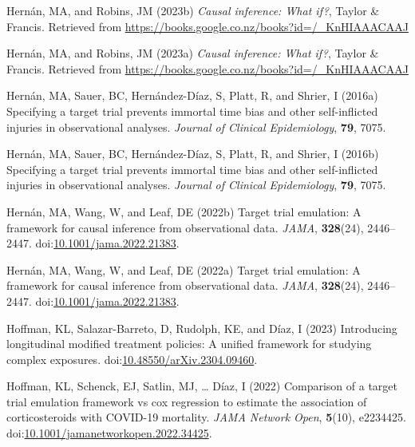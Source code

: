 \documentclass[
  singlecolumn]{article}
\newlength{\cslhangindent}
\newlength{\cslentryspacingunit} %
\newenvironment{CSLReferences}[2] %
 {%
  \setlength{\parindent}{0pt}
  \ifodd #1
  \let\oldpar\par
  \def\par{\hangindent=\cslhangindent\oldpar}
  \fi
  \setlength{\parskip}{#2\cslentryspacingunit}
 }%
 {}
\begin{document}
\begin{CSLReferences}{1}{0}
\leavevmode{}%
Hernán, MA, and Robins, JM (2023b) \emph{Causal inference: What if?},
Taylor \& Francis. Retrieved from
\url{https://books.google.co.nz/books?id=/_KnHIAAACAAJ}

\leavevmode{}%
Hernán, MA, and Robins, JM (2023a) \emph{Causal inference: What if?},
Taylor \& Francis. Retrieved from
\url{https://books.google.co.nz/books?id=/_KnHIAAACAAJ}

\leavevmode{}%
Hernán, MA, Sauer, BC, Hernández-Díaz, S, Platt, R, and Shrier, I
(2016a) Specifying a target trial prevents immortal time bias and other
self-inflicted injuries in observational analyses. \emph{Journal of
Clinical Epidemiology}, \textbf{79}, 7075.

\leavevmode{}%
Hernán, MA, Sauer, BC, Hernández-Díaz, S, Platt, R, and Shrier, I
(2016b) Specifying a target trial prevents immortal time bias and other
self-inflicted injuries in observational analyses. \emph{Journal of
Clinical Epidemiology}, \textbf{79}, 7075.

\leavevmode{}%
Hernán, MA, Wang, W, and Leaf, DE (2022b) Target trial emulation: A
framework for causal inference from observational data. \emph{JAMA},
\textbf{328}(24), 2446--2447.
doi:\href{https://doi.org/10.1001/jama.2022.21383}{10.1001/jama.2022.21383}.

\leavevmode{}%
Hernán, MA, Wang, W, and Leaf, DE (2022a) Target trial emulation: A
framework for causal inference from observational data. \emph{JAMA},
\textbf{328}(24), 2446--2447.
doi:\href{https://doi.org/10.1001/jama.2022.21383}{10.1001/jama.2022.21383}.

\leavevmode{}%
Hoffman, KL, Salazar-Barreto, D, Rudolph, KE, and Díaz, I (2023)
Introducing longitudinal modified treatment policies: A unified
framework for studying complex exposures.
doi:\href{https://doi.org/10.48550/arXiv.2304.09460}{10.48550/arXiv.2304.09460}.

\leavevmode{}%
Hoffman, KL, Schenck, EJ, Satlin, MJ, \ldots{} Díaz, I (2022) Comparison
of a target trial emulation framework vs cox regression to estimate the
association of corticosteroids with COVID-19 mortality. \emph{JAMA
Network Open}, \textbf{5}(10), e2234425.
doi:\href{https://doi.org/10.1001/jamanetworkopen.2022.34425}{10.1001/jamanetworkopen.2022.34425}.


\end{CSLReferences}
\end{document}
